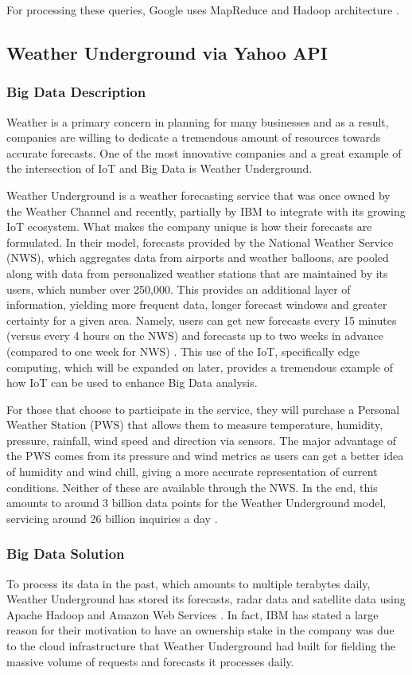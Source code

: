 \documentclass[sigconf]{acmart}
\begin{document}
For processing these queries, Google uses MapReduce and Hadoop architecture \cite{googlearch}.  
\subsection{Weather Underground via Yahoo API}
\subsubsection{Big Data Description}
Weather is a primary concern in planning for many businesses and as a result, companies are willing to dedicate a tremendous amount of resources towards accurate forecasts. One of the most innovative companies and a great example of the intersection of IoT and Big Data is Weather Underground. 

Weather Underground is a weather forecasting service that was once owned by the Weather Channel and recently, partially by IBM to integrate with its growing IoT ecosystem. What makes the company unique is how their forecasts are formulated. In their model, forecasts provided by the National Weather Service (NWS), which aggregates data from airports and weather balloons, are pooled along with data from personalized weather stations that are maintained by its users, which number over 250,000. This provides an additional layer of information, yielding more frequent data, longer forecast windows and greater certainty for a given area. Namely, users can get new forecasts every 15 minutes (versus every 4 hours on the NWS) and forecasts up to two weeks in advance (compared to one week for NWS) \cite{wuabt}. This use of the IoT, specifically edge computing, which will be expanded on later, provides a tremendous example of how IoT can be used to enhance Big Data analysis. 

For those that choose to participate in the service, they will purchase a Personal Weather Station (PWS) that allows them to measure temperature, humidity, pressure, rainfall, wind speed and direction via sensors. The major advantage of the PWS comes from its pressure and wind metrics as users can get a better idea of humidity and wind chill, giving a more accurate representation of current conditions. Neither of these are available through the NWS. In the end, this amounts to around 3 billion data points for the Weather Underground model, servicing around 26 billion inquiries a day \cite{ibm}.

\subsubsection{Big Data Solution}
To process its data in the past, which amounts to multiple terabytes daily, Weather Underground has stored its forecasts, radar data and satellite data using Apache Hadoop and Amazon Web Services \cite{wuinf}. In fact, IBM has stated a large reason for their motivation to have an ownership stake in the company was due to the cloud infrastructure that Weather Underground had built for fielding the massive volume of requests and forecasts it processes daily.  
\end{document}
